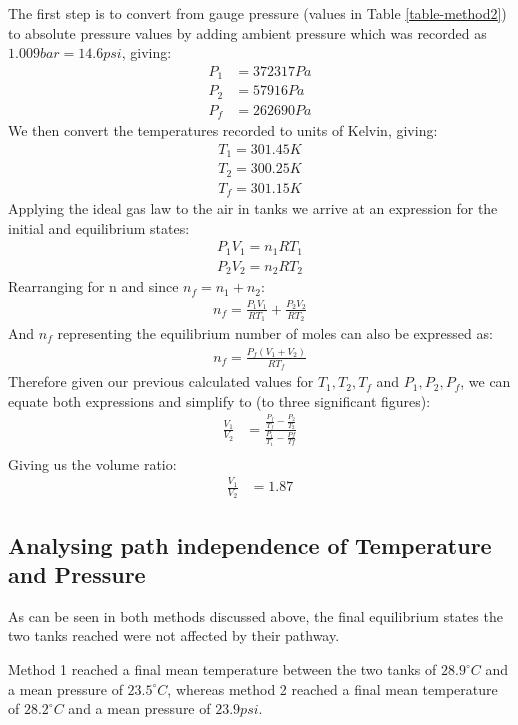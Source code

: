 \documentclass[titlepage, twocolumn, 12pt]{article}
\begin{document}
The first step is to convert from gauge pressure (values in Table \ref{table-method2}) to absolute pressure values by adding ambient pressure which was recorded as \(1.009 bar = 14.6 psi\), giving:
\begin{align*}
P_1&=372317 Pa 
\\P_2&=57916 Pa 
\\P_f&=262690 Pa
\end{align*}
We then convert the temperatures recorded to units of Kelvin, giving:
\begin{align*}
T_1=301.45 K
\\T_2=300.25 K
\\T_f=301.15 K
\end{align*}
Applying the ideal gas law to the air in tanks we arrive at an expression for the initial and equilibrium states:
\begin{align}
    P_1V_1 = n_1RT_1
    \\P_2V_2 = n_2RT_2
\end{align}
Rearranging for n and since \(n_f = n_1+n_2\):
\begin{align}
    n_f = \frac{P_1V_1}{RT_1} + \frac{P_2V_2}{RT_2}
\end{align}
And \(n_f\) representing the equilibrium number of moles can also be expressed as:
\begin{align}
    n_f = \frac{P_f(V_1 +V_2)}{RT_f}
\end{align}
Therefore given our previous calculated values for \(T_1, T_2, T_f\) and \(P_1, P_2, P_f\), we can equate both expressions and simplify to (to three significant figures):
\begin{align*}
    \frac{V_1}{V_2} &= \frac{\frac{P_f}{T_f}- \frac{P_2}{T_2}}{\frac{P_1}{T_1}- \frac{Pf}{Tf}}\\
\end{align*}
Giving us the volume ratio:
\begin{align*}
    \frac{V_1}{V_2} &=1.87
\end{align*}

\subsection{Analysing path independence of Temperature and Pressure}
As can be seen in both methods discussed above, the final equilibrium states the two tanks reached were not affected by their pathway.

Method 1 reached a final mean temperature between the two tanks of \(28.9^{\circ}C\) and a mean pressure of \(23.5^{\circ}C\), whereas method 2 reached a final mean temperature of \(28.2^{\circ}C\) and a mean pressure of \(23.9psi\).
\end{document}
